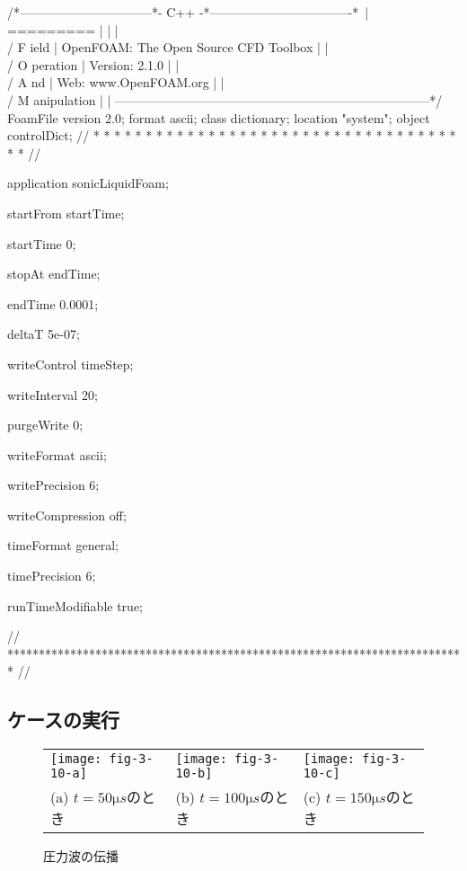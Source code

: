 \begin{OFverbatim}
/*--------------------------------*- C++ -*----------------------------------*\
| =========                 |                                                 |
| \\      /  F ield         | OpenFOAM: The Open Source CFD Toolbox           |
|  \\    /   O peration     | Version:  2.1.0                                 |
|   \\  /    A nd           | Web:      www.OpenFOAM.org                      |
|    \\/     M anipulation  |                                                 |
\*---------------------------------------------------------------------------*/
FoamFile
{
    version     2.0;
    format      ascii;
    class       dictionary;
    location    "system";
    object      controlDict;
}
// * * * * * * * * * * * * * * * * * * * * * * * * * * * * * * * * * * * * * //

application     sonicLiquidFoam;

startFrom       startTime;

startTime       0;

stopAt          endTime;

endTime         0.0001;

deltaT          5e-07;

writeControl    timeStep;

writeInterval   20;

purgeWrite      0;

writeFormat     ascii;

writePrecision  6;

writeCompression off;

timeFormat      general;

timePrecision   6;

runTimeModifiable true;


// ************************************************************************* //
\end{OFverbatim}


\subsection{ケースの実行}
\label{ssec:3.4.4}


\begin{figure}[ht]
 \tabcolsep=1pt
 \begin{tabular}{lll}
  \texttt{[image: fig-3-10-a]} &
  \texttt{[image: fig-3-10-b]} &
  \texttt{[image: fig-3-10-c]} \\
  (a) $t =  50 \unit{\micro s}$のとき &
  (b) $t = 100 \unit{\micro s}$のとき &
  (c) $t = 150 \unit{\micro s}$のとき
 \end{tabular}
 \caption{圧力波の伝播}
 \label{fig:3.10}
\end{figure}


